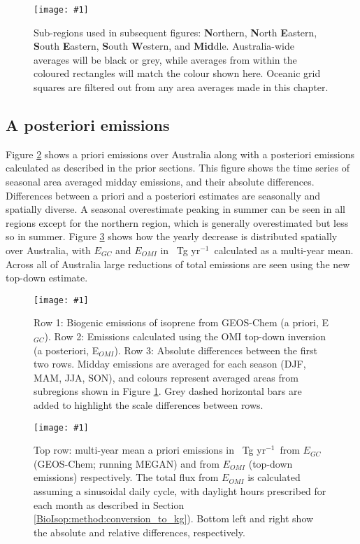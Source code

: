 \documentclass[acp, manuscript]{copernicus}
\newcommand{\apri}{E_{GC}} %
\newcommand{\apost}{E_{OMI}} %
\newcommand{\tgpyr}{~Tg yr$^{-1}$}
\newcommand{\mypic}[3]{%
  \begin{figure}
    \texttt{[image: \#1]}
    \caption{#2}
    #3
  \end{figure}
}
\begin{document}
  \mypic{Figures/subregions.png}{%
    Sub-regions used in subsequent figures: \textbf{N}orthern, \textbf{N}orth \textbf{E}astern, \textbf{S}outh \textbf{E}astern, \textbf{S}outh \textbf{W}estern, and \textbf{Mid}dle.
    Australia-wide averages will be black or grey, while averages from within the coloured rectangles will match the colour shown here.
    Oceanic grid squares are filtered out from any area averages made in this chapter.
  }{\label{BioIsop:results:fig_subregions}}
  

  \subsection{A posteriori emissions}
    \label{BioIsop:results:emissions}
    
    Figure \ref{BioIsop:results:emissions:fig_time_series_vs_megan} shows a priori emissions over Australia along with a posteriori emissions calculated as described in the prior sections.
    This figure shows the time series of seasonal area averaged midday emissions, and their absolute differences.
    Differences between a priori and a posteriori estimates are seasonally and spatially diverse.
    A seasonal overestimate peaking in summer can be seen in all regions except for the northern region, which is generally overestimated but less so in summer.
    Figure \ref{BioIsop:results:emissions:fig_tga_comparison_map} shows how the yearly decrease is distributed spatially over Australia, with $\apri$ and $\apost$ in \tgpyr ~calculated as a multi-year mean.
    Across all of Australia large reductions of total emissions are seen using the new top-down estimate.
    
    \mypic{Figures/new_emiss/RegSeas_emissions_timeseries.png}{%
      Row 1: Biogenic emissions of isoprene from GEOS-Chem (a priori, E$_{GC}$). 
      Row 2: Emissions calculated using the OMI top-down inversion (a posteriori, E$_{OMI}$).
      Row 3: Absolute differences between the first two rows.
      Midday emissions are averaged for each season (DJF, MAM, JJA, SON), and colours represent averaged areas from subregions shown in Figure \ref{BioIsop:results:fig_subregions}.
      Grey dashed horizontal bars are added to highlight the scale differences between rows.
    }{\label{BioIsop:results:emissions:fig_time_series_vs_megan}}
    
    \mypic{Figures/Emiss/tga_map.png}{%
      Top row: multi-year mean a priori emissions in \tgpyr ~from $\apri$ (GEOS-Chem; running MEGAN) and from $\apost$ (top-down emissions) respectively.
      The total flux from $\apost$ is calculated assuming a sinusoidal daily cycle, with daylight hours prescribed for each month as described in Section \ref{BioIsop:method:conversion_to_kg}).
      Bottom left and right show the absolute and relative differences, respectively.}{\label{BioIsop:results:emissions:fig_tga_comparison_map}}
    
\end{document}
